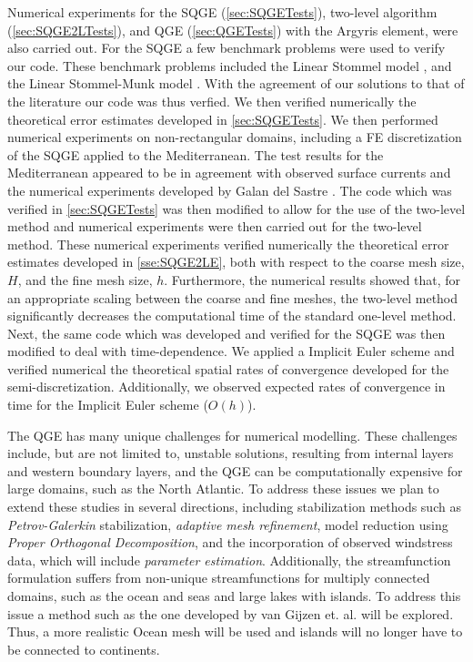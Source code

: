 Numerical experiments for the SQGE (\autoref{sec:SQGETests}), two-level
algorithm (\autoref{sec:SQGE2LTests}), and QGE (\autoref{sec:QGETests}) with the
Argyris element, were also carried out. For the SQGE a few benchmark problems
were used to verify our code. These benchmark problems included the Linear
Stommel model \cite{Vallis06,Myers}, and the Linear Stommel-Munk model
\cite{Cascon}. With the agreement of our solutions to that of the literature our
code was thus verfied. We then verified numerically the theoretical error
estimates developed in \autoref{sec:SQGETests}. We then performed numerical
experiments on non-rectangular domains, including a FE discretization of the
SQGE applied to the Mediterranean. The test results for the Mediterranean appeared
to be in agreement with observed surface currents and the numerical experiments
developed by Galan del Sastre \cite{Galan-del-Sastre2004}. The code which was
verified in \autoref{sec:SQGETests} was then modified to allow for the use of
the two-level method and numerical experiments were then carried out for the
two-level method.  These numerical experiments verified numerically the
theoretical error estimates developed in \autoref{sse:SQGE2LE}, both with
respect to the coarse mesh size, $H$, and the fine mesh size, $h$.  Furthermore,
the numerical results showed that, for an appropriate scaling between the coarse
and fine meshes, the two-level method significantly decreases the computational
time of the standard one-level method. Next, the same code which was developed
and verified for the SQGE was then modified to deal with time-dependence. We
applied a Implicit Euler scheme and verified numerical the theoretical spatial
rates of convergence developed for the semi-discretization. Additionally, we
observed expected rates of convergence in time for the Implicit Euler scheme
($O(h)$).

The QGE has many unique challenges for numerical modelling. These challenges
include, but are not limited to, unstable solutions, resulting from internal
layers and western boundary layers, and the QGE can be computationally expensive
for large domains, such as the North Atlantic. To address these issues we plan
to extend these studies in several directions, including stabilization methods
such as \emph{Petrov-Galerkin} stabilization, \emph{adaptive mesh refinement},
model reduction using \emph{Proper Orthogonal Decomposition}, and the
incorporation of observed windstress data, which will include \emph{parameter
estimation}. Additionally, the streamfunction formulation suffers from
non-unique streamfunctions for multiply connected domains, such as the ocean and
seas and large lakes with islands. To address this issue a method such as the
one developed by van Gijzen et. al. \cite{van-Gijzen1998} will be explored.
Thus, a more realistic Ocean mesh will be used and islands will no longer have
to be connected to continents.
